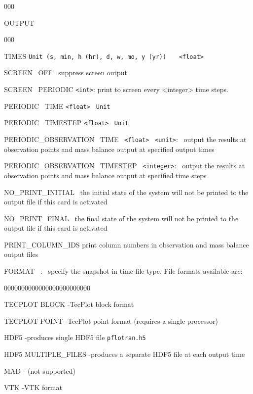 \begin{deflist}{000}
\item[OUTPUT] ~
\begin{deflist}{000}
\item[TIMES] {\tt Unit (s, min, h (hr), d, w, mo, y (yr))} \ \ \ {\tt <float>} 
\item[SCREEN \ OFF] \ suppress screen output
\item[SCREEN \ PERIODIC] {\tt <int>}: print to screen every <integer> time steps.
\item[PERIODIC \ TIME] {\tt <float>} \ {\tt Unit}
\item[PERIODIC \ TIMESTEP] {\tt <float>} \ {\tt Unit}
\item[PERIODIC\_OBSERVATION \ TIME] \ {\tt <float>} \ {\tt <unit>}: \ output the results at observation points and mass balance output at specified output times
\item[PERIODIC\_OBSERVATION \ TIMESTEP] \ {\tt <integer>}: \ output the results at observation points and mass balance output at specified time steps 
\item[NO\_PRINT\_INITIAL] \ the initial state of the system will not be printed to the output file if this card is activated
\item[NO\_PRINT\_FINAL] \ the final state of the system will not be printed to the output file if this card is activated
\item[PRINT\_COLUMN\_IDS] print column numbers in observation and mass balance output files
\item[FORMAT] \ <file format>: \ specify the snapshot in time file type. File formats available are: 
\begin{deflist}{0000000000000000000000000}
\item[TECPLOT BLOCK] -TecPlot block format
\item[TECPLOT POINT] -TecPlot point format (requires a single processor)
\item[HDF5] -produces single HDF5 file {\tt pflotran.h5}
\item[HDF5 MULTIPLE\_FILES] -produces a separate HDF5 file at each output time
\item[MAD] - (not supported)
\item[VTK] -VTK format
\end{deflist}

\end{deflist}
\end{deflist}
